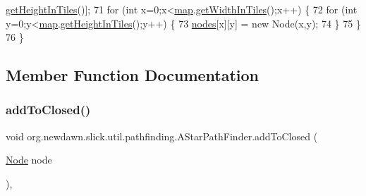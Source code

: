 \begin{DoxyCode}
      \mbox{\hyperlink{interfaceorg_1_1newdawn_1_1slick_1_1util_1_1pathfinding_1_1_tile_based_map_a9669f3dafa1ce48a20e3d7d8c1de239a}{getHeightInTiles}}()];
71         \textcolor{keywordflow}{for} (\textcolor{keywordtype}{int} x=0;x<\mbox{\hyperlink{classorg_1_1newdawn_1_1slick_1_1util_1_1pathfinding_1_1_a_star_path_finder_afdd901a5fe460e8ec85405cdd5389931}{map}}.\mbox{\hyperlink{interfaceorg_1_1newdawn_1_1slick_1_1util_1_1pathfinding_1_1_tile_based_map_a5efac540b233405c4ae65b784a7c6d22}{getWidthInTiles}}();x++) \{
72             \textcolor{keywordflow}{for} (\textcolor{keywordtype}{int} y=0;y<\mbox{\hyperlink{classorg_1_1newdawn_1_1slick_1_1util_1_1pathfinding_1_1_a_star_path_finder_afdd901a5fe460e8ec85405cdd5389931}{map}}.\mbox{\hyperlink{interfaceorg_1_1newdawn_1_1slick_1_1util_1_1pathfinding_1_1_tile_based_map_a9669f3dafa1ce48a20e3d7d8c1de239a}{getHeightInTiles}}();y++) \{
73                 \mbox{\hyperlink{classorg_1_1newdawn_1_1slick_1_1util_1_1pathfinding_1_1_a_star_path_finder_ab7dd9208b4a62c2289f049d4a32e7bbd}{nodes}}[x][y] = \textcolor{keyword}{new} Node(x,y);
74             \}
75         \}
76     \}
\end{DoxyCode}


\subsection{Member Function Documentation}
\mbox{\label{classorg_1_1newdawn_1_1slick_1_1util_1_1pathfinding_1_1_a_star_path_finder_a7978ff6c8e01fd6b55650f9eff9723ed}} 
\subsubsection{\texorpdfstring{add\+To\+Closed()}{addToClosed()}}
{\footnotesize\ttfamily void org.\+newdawn.\+slick.\+util.\+pathfinding.\+A\+Star\+Path\+Finder.\+add\+To\+Closed (\begin{DoxyParamCaption}\item[{\mbox{\hyperlink{classorg_1_1newdawn_1_1slick_1_1util_1_1pathfinding_1_1_a_star_path_finder_1_1_node}{Node}}}]{node }\end{DoxyParamCaption})\hspace{0.3cm}{\ttfamily [inline]}, {\ttfamily [protected]}}

